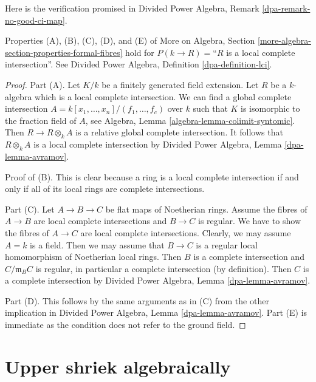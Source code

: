 \noindent
Here is the verification promised in
Divided Power Algebra, Remark \ref{dpa-remark-no-good-ci-map}.

\begin{lemma}
\label{lemma-formal-fibres-lci}
Properties (A), (B), (C), (D), and (E) of
More on Algebra, Section \ref{more-algebra-section-properties-formal-fibres}
hold for $P(k \to R) =$``$R$ is a local complete intersection''.
See Divided Power Algebra, Definition \ref{dpa-definition-lci}.
\end{lemma}

\begin{proof}
Part (A). Let $K/k$ be a finitely generated field extension.
Let $R$ be a $k$-algebra which is a local complete intersection.
We can find a global complete intersection
$A = k[x_1, \ldots, x_n]/(f_1, \ldots, f_c)$
over $k$ such that $K$ is isomorphic to the fraction field of $A$, see
Algebra, Lemma \ref{algebra-lemma-colimit-syntomic}.
Then $R \to R \otimes_k A$ is a relative global complete intersection.
It follows that $R \otimes_k A$ is a local complete intersection
by Divided Power Algebra, Lemma \ref{dpa-lemma-avramov}.

\medskip\noindent
Proof of (B). This is clear
because a ring is a local complete intersection if and only if all of its
local rings are complete intersections.

\medskip\noindent
Part (C). Let $A \to B \to C$ be flat maps of Noetherian rings.
Assume the fibres of $A \to B$ are local complete intersections
and $B \to C$ is regular. We have to show the fibres of $A \to C$
are local complete intersections. Clearly, we may assume $A = k$ is a field.
Then we may assume that $B \to C$ is a regular local homomorphism
of Noetherian local rings. Then $B$ is a complete intersection and
$C/\mathfrak m_B C$ is regular, in particular a complete intersection
(by definition). Then $C$ is a complete intersection by
Divided Power Algebra, Lemma \ref{dpa-lemma-avramov}.

\medskip\noindent
Part (D). This follows by the same arguments as in (C) from
the other implication in
Divided Power Algebra, Lemma \ref{dpa-lemma-avramov}.
Part (E) is immediate as the condition does not refer to the ground
field.
\end{proof}






\section{Upper shriek algebraically}
\label{section-relative-dualizing-complex-algebraic}

